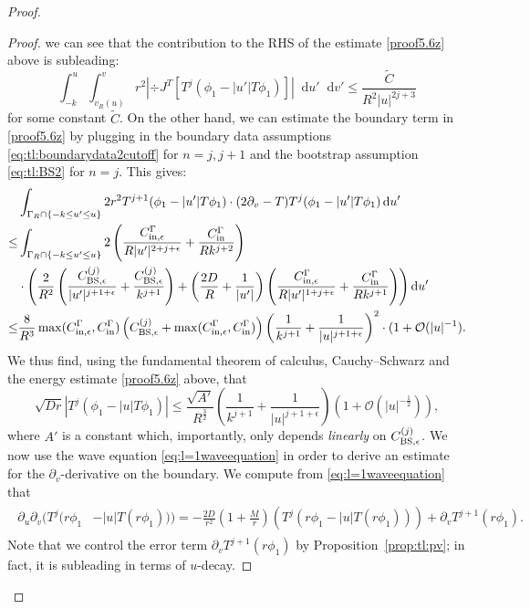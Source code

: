 \documentclass[11pt,english]{article}
\numberwithin{equation}{section}
\theoremstyle{remark}
\theoremstyle{plain}
\theoremstyle{remark}
\newcommand{\dd}{\mathop{}\!\mathrm{d}}
\newcommand{\pu}{\partial_u}
\newcommand{\pv}{\partial_v}
\renewcommand{\(}{\left(}
\renewcommand{\)}{\right)}
\begin{document}
\begin{proof}
\begin{proof}
we can see that the contribution to the RHS of the estimate \eqref{proof5.6z} above is  subleading: 
\begin{equation}
\int_{-k}^u\int_{v_R(u)}^v r^2\left|\div J^T[T^j(\phi_1-|u'|T\phi_1)]\right|\dd u'\dd v'\leq \frac{\tilde{C}}{R^2|u|^{2j+3}}
\end{equation}
for some constant $\tilde{C}$.
On the other hand, we  can estimate the boundary term in \eqref{proof5.6z} by plugging in the boundary data assumptions \eqref{eq:tl:boundarydata2cutoff} for $n=j,j+1$ and the bootstrap assumption \eqref{eq:tl:BS2} for $n=j$. This gives:
\begin{align*}
& \int_{\Gamma_R\cap\{-k\leq u'\leq u\}}  2r^2 T^{j+1}(\phi_1-|u'|T\phi_1)\cdot (2\pv-T)T^j(\phi_1-|u'|T\phi_1)	 \dd u'\\
 \leq&  \int_{\Gamma_R\cap\{-k\leq u'\leq u\}}2\left(\frac{\ce}{R|u'|^{2+j+\epsilon}}+\frac{\cin}{Rk^{j+2}}	\right)\\
 &\cdot\left(\frac{2}{R^2}\left(\frac{\cbse^{(j)}}{|u'|^{j+1+\epsilon}}+\frac{\cbse^{(j)}}{k^{j+1}}\right)+\left(\frac{2D}{R}+\frac{1}{|u'|}\right)\left(\frac{\ce}{R|u'|^{1+j+\epsilon}}+\frac{\cin}{Rk^{j+1}}	\right)\right)\dd u' \\
 \leq&\frac{8}{R^3}\max(\ce,\cin)\left(\cbse^{(j)}+\max(\ce,\cin)\right)\left(	\frac{1}{k^{j+1}}+\frac{1}{|u|^{j+1+\epsilon}}	\right)^2\cdot (1+\mathcal{O}(|u|^{-1}).
\end{align*}
We thus find, using the fundamental theorem of calculus, Cauchy--Schwarz and the energy estimate \eqref{proof5.6z} above, that
\begin{equation}\label{proof5.6x}
\sqrt{Dr}|T^j(\phi_1-|u|T\phi_1)|\leq \frac{\sqrt{A'}}{R^{\frac32}}\left(\frac{1}{k^{j+1}}+\frac{1}{|u|^{j+1+\epsilon}}\right)(1+\mathcal{O}(|u|^{-\frac12})),
\end{equation}
where $A'$ is a constant which, importantly, only depends \textit{linearly} on $C_{\mathrm{BS},\epsilon}^{(j)}$. We now use the wave equation \eqref{eq:l=1waveequation} in order to derive an estimate for the $\pv$-derivative on the boundary. We compute from \eqref{eq:l=1waveequation} that
\begin{align}\label{proof5.6yy}
\begin{split}
\pu\pv(T^j(r\phi_1&-|u| T(r\phi_1)))=-\frac{2D}{r^2}\left(1+\frac{M}{r}\right)(T^j(r\phi_1-|u| T(r\phi_1)))+\pv T^{j+1}(r\phi_1).
\end{split}
\end{align}
Note that we control the error term $\pv T^{j+1}(r\phi_1)$ by Proposition~\ref{prop:tl:pv}; in fact, it is subleading in terms of $u$-decay.

\end{proof}
\end{proof}
\end{document}
